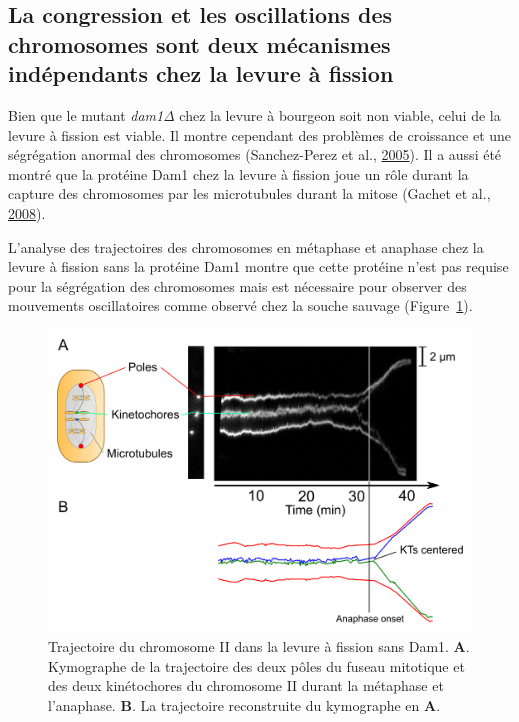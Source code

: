 \documentclass[12pt,a4paper,twoside,openright]{book}
\begin{document}
\subsection{La congression et les oscillations des chromosomes sont deux
mécanismes indépendants chez la levure à
fission}\label{la-congression-et-les-oscillations-des-chromosomes-sont-deux-muxe9canismes-induxe9pendants-chez-la-levure-uxe0-fission}

Bien que le mutant \emph{dam1Δ} chez la levure à bourgeon soit non
viable, celui de la levure à fission est viable. Il montre cependant des
problèmes de croissance et une ségrégation anormal des chromosomes
(Sanchez-Perez et al., \hyperref[ref-Sanchez-Perez2005]{2005}). Il a
aussi été montré que la protéine Dam1 chez la levure à fission joue un
rôle durant la capture des chromosomes par les microtubules durant la
mitose (Gachet et al., \hyperref[ref-Gachet2008a]{2008}).

L'analyse des trajectoires des chromosomes en métaphase et anaphase chez
la levure à fission sans la protéine Dam1 montre que cette protéine
n'est pas requise pour la ségrégation des chromosomes mais est
nécessaire pour observer des mouvements oscillatoires comme observé chez
la souche sauvage (Figure~\ref{fig:dam1-traj}).

\begin{figure}[htbp]
\centering
\includegraphics{figures/annexes/dam1-traj.png}
\caption[Trajectoire du chromosome II dans la levure à fission sans Dam1]{\label{fig:dam1-traj}Trajectoire
du chromosome II dans la levure à fission sans Dam1. \textbf{A}.
Kymographe de la trajectoire des deux pôles du fuseau mitotique et des
deux kinétochores du chromosome II durant la métaphase et l'anaphase.
\textbf{B}. La trajectoire reconstruite du kymographe en \textbf{A}.}
\end{figure}
\end{document}
